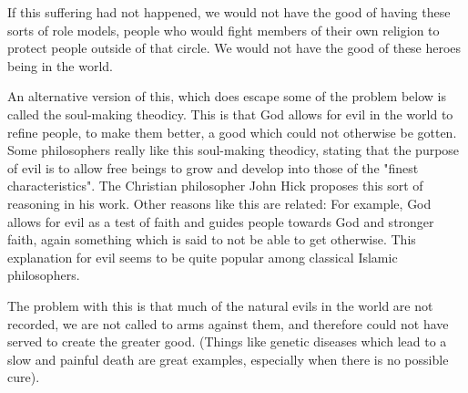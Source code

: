 
If this suffering had not happened, we would not have the good of having these sorts of role models, people who would fight members of their own religion to protect people outside of that circle. We would not have the good of these heroes being in the world.

An alternative version of this, which does escape some of the problem below is called the soul-making theodicy. This is that God allows for evil in the world to refine people, to make them better, a good which could not otherwise be gotten. Some philosophers really like this soul-making theodicy, stating that the purpose of evil is to allow free beings to grow and develop into those of the "finest characteristics". The Christian philosopher John Hick proposes this sort of reasoning in his work.\autocite{Hick1} Other reasons like this are related: For example, God allows for evil as a test of faith and guides people towards God and stronger faith, again something which is said to not be able to get otherwise. This explanation for evil seems to be quite popular among classical Islamic philosophers.\autocite{Rouzati1}

The problem with this is that much of the natural evils in the world are not recorded, we are not called to arms against them, and therefore could not have served to create the greater good. (Things like genetic diseases which lead to a slow and painful death are great examples, especially when there is no possible cure).

